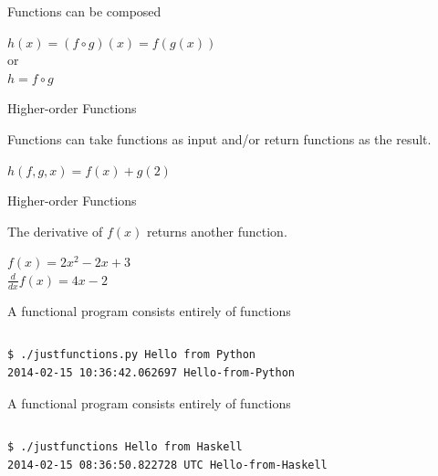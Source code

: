 \documentclass{beamer}
\begin{document}
\begin{frame}{Functions can be composed}

  {\Huge $h(x) = (f \circ g)(x) = f(g(x))$\\
  \vskip5mm
  or\\
  \vskip5mm
  $h = f \circ g$}

\end{frame}

\begin{frame}{Higher-order Functions}

  {\Large Functions can take functions as input and/or return
    functions as the result.}

  \vskip5mm

  {\Huge $h(f, g, x) = f(x) + g(2)$}

\end{frame}

\begin{frame}{Higher-order Functions}

  {\Large The derivative of $f(x)$ returns another function.}

  \vskip5mm

  {\Large $f(x) = 2x^2 - 2x + 3$}\\
  {\Large $\frac{d}{dx} f(x) = 4x - 2$}


\end{frame}

\begin{frame}[fragile]{A functional program consists entirely of functions}

  \inputminted[firstline=6,lastline=15]{python}{code/python/justfunctions.py}

  \begin{verbatim}
$ ./justfunctions.py Hello from Python
2014-02-15 10:36:42.062697 Hello-from-Python
  \end{verbatim}

\end{frame}

\begin{frame}[fragile]{A functional program consists entirely of functions}

  \inputminted[firstline=5]{haskell}{code/haskell/justfunctions.hs}

  \begin{verbatim}
$ ./justfunctions Hello from Haskell
2014-02-15 08:36:50.822728 UTC Hello-from-Haskell
  \end{verbatim}

\end{frame}
\end{document}
